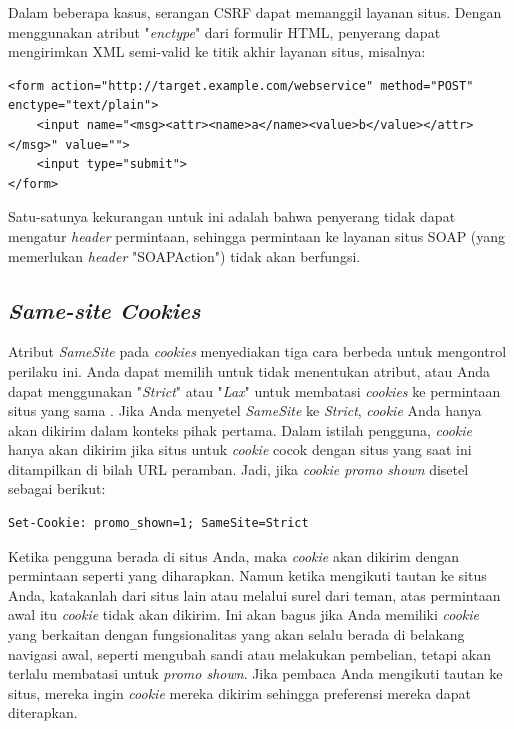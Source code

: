 \documentclass{article}
\begin{document}
\begin{enumerate}
Dalam beberapa kasus, serangan CSRF dapat memanggil layanan situs. Dengan menggunakan atribut "\textit{enctype}" dari formulir HTML, penyerang dapat mengirimkan XML semi-valid ke titik akhir layanan situs, misalnya:
\begin{lstlisting}
<form action="http://target.example.com/webservice" method="POST" enctype="text/plain">
    <input name="<msg><attr><name>a</name><value>b</value></attr></msg>" value="">
    <input type="submit">
</form>
\end{lstlisting}
Satu-satunya kekurangan untuk ini adalah bahwa penyerang tidak dapat mengatur \textit{header} permintaan, sehingga permintaan ke layanan situs SOAP (yang memerlukan \textit{header} "SOAPAction") tidak akan berfungsi.
\end{enumerate}

\subsection{\textit{Same-site Cookies}}
Atribut \textit{SameSite} pada \textit{cookies} menyediakan tiga cara berbeda untuk mengontrol perilaku ini. Anda dapat memilih untuk tidak menentukan atribut, atau Anda dapat menggunakan "\textit{Strict}" atau "\textit{Lax}" untuk membatasi \textit{cookies} ke permintaan situs yang sama \cite{SameSite9:online}. Jika Anda menyetel \textit{SameSite} ke \textit{Strict}, \textit{cookie} Anda hanya akan dikirim dalam konteks pihak pertama. Dalam istilah pengguna, \textit{cookie} hanya akan dikirim jika situs untuk \textit{cookie} cocok dengan situs yang saat ini ditampilkan di bilah URL peramban. Jadi, jika \textit{cookie promo shown} disetel sebagai berikut:
\begin{lstlisting}
Set-Cookie: promo_shown=1; SameSite=Strict
\end{lstlisting}

Ketika pengguna berada di situs Anda, maka \textit{cookie} akan dikirim dengan permintaan seperti yang diharapkan. Namun ketika mengikuti tautan ke situs Anda, katakanlah dari situs lain atau melalui surel dari teman, atas permintaan awal itu \textit{cookie} tidak akan dikirim. Ini akan bagus jika Anda memiliki \textit{cookie} yang berkaitan dengan fungsionalitas yang akan selalu berada di belakang navigasi awal, seperti mengubah sandi atau melakukan pembelian, tetapi akan terlalu membatasi untuk \textit{promo shown}. Jika pembaca Anda mengikuti tautan ke situs, mereka ingin \textit{cookie} mereka dikirim sehingga preferensi mereka dapat diterapkan. 
\end{document}
